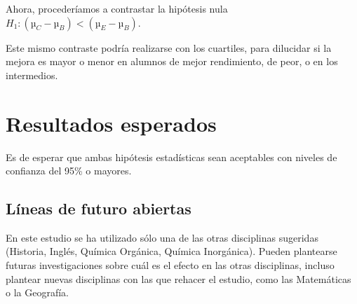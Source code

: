 \documentclass[palatino,miniheader]{apuntesURJC}
\begin{document}
Ahora, procederíamos a contrastar la hipótesis nula $H_1: (µ_C - µ_B) < (µ_E - µ_B)$.

Este mismo contraste podría realizarse con los cuartiles, para dilucidar si la mejora es mayor o menor en alumnos de mejor rendimiento, de peor, o en los intermedios.





\chapter{Resultados esperados}

Es de esperar que ambas hipótesis estadísticas sean aceptables con niveles de confianza del 95\% o mayores.
%

\section{Líneas de futuro abiertas}

En este estudio se ha utilizado sólo una de las otras disciplinas sugeridas (Historia, Inglés, Química Orgánica, Química Inorgánica). 
%
Pueden plantearse futuras investigaciones sobre cuál es el efecto en las otras disciplinas, incluso plantear nuevas disciplinas con las que rehacer el estudio, como las Matemáticas o la Geografía.
\end{document}
